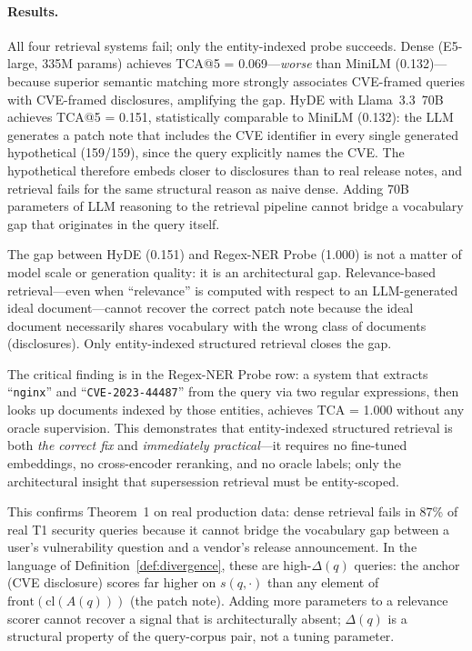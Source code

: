 \documentclass[11pt]{article}
\begin{document}
\paragraph{Results.} All four retrieval systems fail; only the entity-indexed probe succeeds.
Dense (E5-large, 335M params) achieves TCA@5 = 0.069---\emph{worse} than MiniLM (0.132)---because superior semantic matching more strongly associates CVE-framed queries with CVE-framed disclosures, amplifying the gap.
HyDE with Llama~3.3~70B achieves TCA@5 = 0.151, statistically comparable to MiniLM (0.132): the LLM generates a patch note that includes the CVE identifier in every single generated hypothetical (159/159), since the query explicitly names the CVE. The hypothetical therefore embeds closer to disclosures than to real release notes, and retrieval fails for the same structural reason as naive dense. Adding 70B parameters of LLM reasoning to the retrieval pipeline cannot bridge a vocabulary gap that originates in the query itself.

The gap between HyDE (0.151) and Regex-NER Probe (1.000) is not a matter of model scale or generation quality: it is an architectural gap. Relevance-based retrieval---even when ``relevance'' is computed with respect to an LLM-generated ideal document---cannot recover the correct patch note because the ideal document necessarily shares vocabulary with the wrong class of documents (disclosures). Only entity-indexed structured retrieval closes the gap.

The critical finding is in the Regex-NER Probe row: a system that extracts ``\texttt{nginx}'' and ``\texttt{CVE-2023-44487}'' from the query via two regular expressions, then looks up documents indexed by those entities, achieves TCA = 1.000 without any oracle supervision. This demonstrates that entity-indexed structured retrieval is both \emph{the correct fix} and \emph{immediately practical}---it requires no fine-tuned embeddings, no cross-encoder reranking, and no oracle labels; only the architectural insight that supersession retrieval must be entity-scoped.

This confirms Theorem~1 on real production data: dense retrieval fails in 87\% of real T1 security queries because it cannot bridge the vocabulary gap between a user's vulnerability question and a vendor's release announcement. In the language of Definition~\ref{def:divergence}, these are high-$\Delta(q)$ queries: the anchor (CVE disclosure) scores far higher on $s(q,\cdot)$ than any element of $\mathrm{front}(\mathrm{cl}(A(q)))$ (the patch note). Adding more parameters to a relevance scorer cannot recover a signal that is architecturally absent; $\Delta(q)$ is a structural property of the query-corpus pair, not a tuning parameter.
\end{document}
